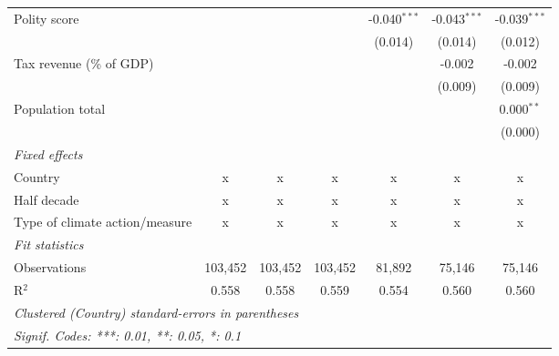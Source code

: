 \begin{tabular}{lcccccc}
   Polity score                                                  &         &                &                & -0.040$^{***}$ & -0.043$^{***}$ & -0.039$^{***}$\\   
                                                                 &         &                &                & (0.014)        & (0.014)        & (0.012)\\   
   Tax revenue (\% of GDP)                                       &         &                &                &                & -0.002         & -0.002\\   
                                                                 &         &                &                &                & (0.009)        & (0.009)\\   
   Population total                                              &         &                &                &                &                & 0.000$^{**}$\\   
                                                                 &         &                &                &                &                & (0.000)\\   
   \emph{Fixed effects}\\
   Country                                                       & x       & x              & x              & x              & x              & x\\  
   Half decade                                                   & x       & x              & x              & x              & x              & x\\  
   Type of climate action/measure                                & x       & x              & x              & x              & x              & x\\  
   \midrule \emph{Fit statistics}\\
   Observations                                                  & 103,452 & 103,452        & 103,452        & 81,892         & 75,146         & 75,146\\  
   R$^2$                                                         & 0.558   & 0.558          & 0.559          & 0.554          & 0.560          & 0.560\\  
   \midrule
   \multicolumn{7}{l}{\emph{Clustered (Country) standard-errors in parentheses}}\\
   \multicolumn{7}{l}{\emph{Signif. Codes: ***: 0.01, **: 0.05, *: 0.1}}\\
\end{tabular}
\par\endgroup


